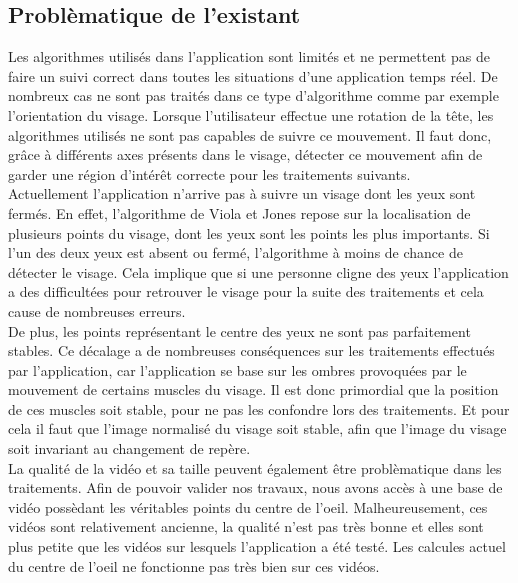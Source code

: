 \subsection{Problèmatique de l'existant}
Les algorithmes utilisés dans l'application sont limités et ne permettent pas de faire un suivi correct
dans toutes les situations d'une application temps réel. De nombreux cas ne sont
pas traités dans ce type d'algorithme comme par exemple l'orientation du visage. Lorsque
l'utilisateur effectue une rotation de la tête, les algorithmes utilisés ne sont pas capables
de suivre ce mouvement. Il faut donc, grâce à différents axes présents dans le visage, détecter
ce mouvement afin de garder une région d'intérêt correcte pour les traitements suivants.\\

Actuellement l'application n'arrive pas à suivre un visage dont les yeux sont fermés. En effet,
l'algorithme de Viola et Jones repose sur la localisation de plusieurs points du visage, dont 
les yeux sont les points les plus importants. Si l'un des deux yeux est absent ou fermé, l'algorithme 
à moins de chance de détecter le visage. Cela implique que si une personne cligne des yeux
l'application a des difficultées pour retrouver le visage pour la suite des traitements et cela 
cause de nombreuses erreurs.\\

De plus, les points représentant le centre des yeux ne sont pas parfaitement stables. Ce décalage a de 
nombreuses conséquences sur les traitements effectués par l'application, car l'application se base sur 
les ombres provoquées par le mouvement de certains muscles du 
visage. Il est donc primordial que la position de ces muscles soit stable, pour ne pas les confondre
lors des traitements. Et pour cela il faut que l'image normalisé du visage soit stable, afin que l'image
du visage soit invariant au changement de repère.\\

La qualité de la vidéo et sa taille peuvent également être problèmatique dans les traitements. Afin de
pouvoir valider nos travaux, nous avons accès à une base de vidéo possèdant les véritables points
du centre de l'oeil. Malheureusement, ces vidéos sont relativement ancienne, la qualité n'est pas 
très bonne et elles sont plus petite que les vidéos sur lesquels l'application a été testé. Les 
calcules actuel du centre de l'oeil ne fonctionne pas très bien sur ces vidéos.\\

